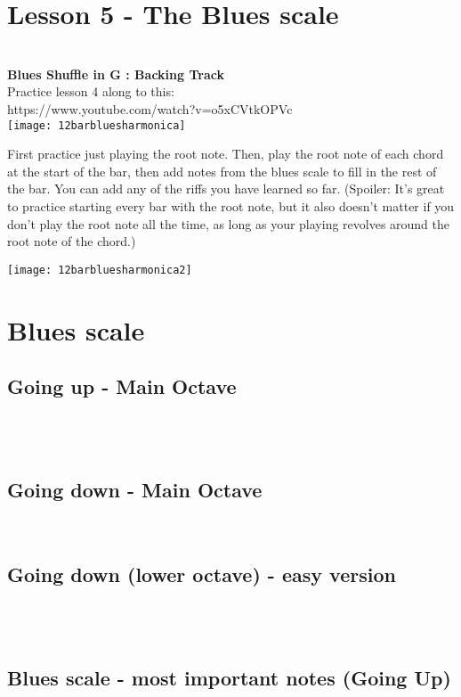 \section{Lesson 5 -  The Blues scale}\\
\textbf{Blues Shuffle in G : Backing Track}\\
Practice lesson 4 along to this: \\ 
https://www.youtube.com/watch?v=o5xCVtkOPVc\\


    \texttt{[image: 12barbluesharmonica]}
    



First practice just playing the root note. 
Then, play the root note of each chord at the start of the bar, then add notes from the blues scale to fill in the rest of the bar. You can add any of the riffs you have learned so far. 
(Spoiler: It's great to practice starting every bar with the root note, but it also doesn't matter if you don't play the root note all the time, as long as your playing revolves around the root note of the chord.)

\newpage    
    \texttt{[image: 12barbluesharmonica2]}
\newpage
 \section{Blues scale}

\subsection{Going up - Main Octave}\\
\2\3\four\e\4\5\six\\

\subsection{Going down - Main Octave}\\
\six\5\4\e\four\3\2

\subsection{Going down (lower octave) - easy version}\\
\2\w\1\\


\subsection{Blues scale - most important notes (Going Up)}\\
\1\w \2 \\
\2\3\four\e\4\5\\

